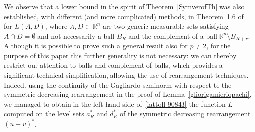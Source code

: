 \documentclass[12pt]{article}
\newcommand{\R}{\mathbb{R}}
\numberwithin{equation}{section}
\begin{document}
We observe that a lower bound 
in the spirit of Theorem~\ref{SymverofTh}
was also established, with different (and more complicated)
methods, in Theorem~1.6 of~\cite{MR3133422}
for $L(A,D)$, where $A,D\subset\R^n$ are two generic measurable sets satisfying $A\cap D=\emptyset$ and not necessarily a ball $B_R$ and the complement of a ball $\R^n\setminus B_{R+r}$. Although it is possible to prove such a general result also for $p\neq 2$, for the purpose of this paper this further generality is not necessary: we can thereby restrict our attention to balls and complement of balls,
which provides a significant technical simplification, allowing the use of rearrangement techniques. Indeed, using the continuity of the Gagliardo seminorm with respect to the symmetric decreasing rearrangement in the proof of Lemma~\ref{gliorigamieriopachi}, we managed to obtain in the left-hand side of~\eqref{iattoll-90843} the function $L$ computed on the level sets $a_R^*$ and $d_R^*$ of the symmetric decreasing rearrangement $(u-v)^*$.
\end{document}
